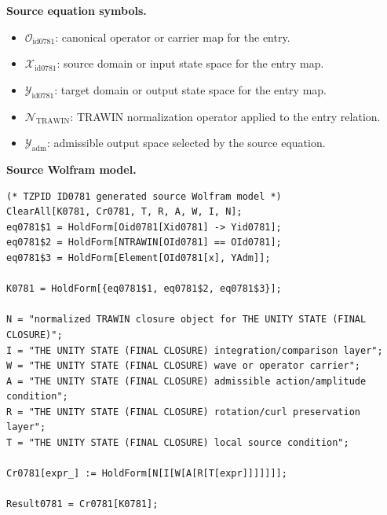 \begin{minipage}[t]{0.49\linewidth}
\begingroup
\small
\raggedright
\textbf{Source equation symbols.}\par
\begin{itemize}[leftmargin=1.35em,itemsep=1pt,topsep=1pt,parsep=0pt]
    \item $\mathcal{O}_{\mathrm{id0781}}$: canonical operator or carrier map for the entry.
    \item $\mathcal{X}_{\mathrm{id0781}}$: source domain or input state space for the entry map.
    \item $\mathcal{Y}_{\mathrm{id0781}}$: target domain or output state space for the entry map.
    \item $\mathcal{N}_{\mathrm{TRAWIN}}$: TRAWIN normalization operator applied to the entry relation.
    \item $\mathcal{Y}_{\mathrm{adm}}$: admissible output space selected by the source equation.
\end{itemize}
\endgroup
\end{minipage}\hfill
\begin{minipage}[t]{0.47\linewidth}
\begingroup
\scriptsize
\raggedright
\textbf{Source Wolfram model.}\par
\begin{Verbatim}[fontsize=\tiny,breaklines=true,breakanywhere=true]
(* TZPID ID0781 generated source Wolfram model *)
ClearAll[K0781, Cr0781, T, R, A, W, I, N];
eq0781$1 = HoldForm[Oid0781[Xid0781] -> Yid0781];
eq0781$2 = HoldForm[NTRAWIN[OId0781] == OId0781];
eq0781$3 = HoldForm[Element[OId0781[x], YAdm]];

K0781 = HoldForm[{eq0781$1, eq0781$2, eq0781$3}];

N = "normalized TRAWIN closure object for THE UNITY STATE (FINAL CLOSURE)";
I = "THE UNITY STATE (FINAL CLOSURE) integration/comparison layer";
W = "THE UNITY STATE (FINAL CLOSURE) wave or operator carrier";
A = "THE UNITY STATE (FINAL CLOSURE) admissible action/amplitude condition";
R = "THE UNITY STATE (FINAL CLOSURE) rotation/curl preservation layer";
T = "THE UNITY STATE (FINAL CLOSURE) local source condition";

Cr0781[expr_] := HoldForm[N[I[W[A[R[T[expr]]]]]]];

Result0781 = Cr0781[K0781];
\end{Verbatim}
\endgroup
\end{minipage}

